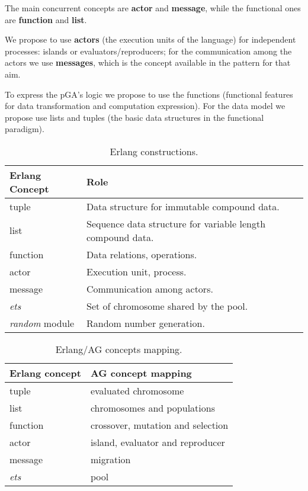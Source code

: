 
The main concurrent concepts are \textbf{actor} and \textbf{message}, while the functional ones are \textbf{function} and \textbf{list}.

We propose to use \textbf{actors} (the execution units of the language) for independent processes: islands or evaluators/reproducers; for the communication among the actors we use \textbf{messages}, which is the concept available in the pattern for that aim.

To express the pGA’s logic we propose to use the functions (functional features for data transformation and computation expression). For the data model we propose use lists and tuples (the basic data structures in the functional paradigm).


\begin{table*}
  \centering
   \caption{Erlang constructions.}\label{erlConstructions}
\begin{tabular}{|>{\centering}p{3.4cm}|p{7cm}|}
  \hline
  \textbf{Erlang Concept} & \textbf{Role} \tabularnewline
     \hline
  tuple & Data structure for immutable compound data. \tabularnewline
     \hline
  list & Sequence data structure for variable length compound data. \tabularnewline
     \hline
  function & Data relations, operations. \tabularnewline
     \hline
  actor & Execution unit, process. \tabularnewline
     \hline
  message & Communication among actors. \tabularnewline
     \hline
  {\em ets} & Set of chromosome shared by the pool. \tabularnewline
     \hline
  {\em random} module& Random number generation. \tabularnewline
  \hline
\end{tabular}

\end{table*}

\begin{table*}
  \centering
  \caption{Erlang/AG concepts mapping.}\label{erlAGRelation}
\begin{tabular}{|>{\centering}p{3cm}|p{6cm}|}
  \hline
  \textbf{Erlang concept} & \textbf{AG concept mapping} \tabularnewline
     \hline
  tuple & evaluated chromosome \tabularnewline
     \hline
  list & chromosomes and populations \tabularnewline
     \hline
  function & crossover, mutation and selection \tabularnewline
     \hline
  actor  & island, evaluator and reproducer \tabularnewline
     \hline
  message & migration \tabularnewline
     \hline
  {\em ets}  & pool \tabularnewline
     \hline

\end{tabular}

\end{table*}


